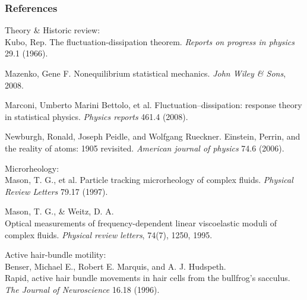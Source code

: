 \documentclass[xcolor=x11names,compress]{beamer}
\renewcommand{\(}{\begin{columns}}
\renewcommand{\)}{\end{columns}}
\newcommand{\<}[1]{\begin{column}{#1}}
\renewcommand{\>}{\end{column}}
\begin{document}
\begin{frame}[t]
    \frametitle<presentation>{References}    

    \scriptsize
    Theory \& Historic review:\\
    \vspace{0.1cm}
    \tiny
    Kubo, Rep. 
    The fluctuation-dissipation theorem.
    \textit{Reports on progress in physics} 29.1 (1966).
    \vspace{0.1cm}

    Mazenko, Gene F.
    Nonequilibrium statistical mechanics. 
    \textit{John Wiley \& Sons}, 2008.
    \vspace{0.1cm}

    Marconi, Umberto Marini Bettolo, et al.
    Fluctuation–dissipation: response theory in statistical physics.
    \textit{Physics reports} 461.4 (2008).
    \vspace{0.1cm}

    Newburgh, Ronald, Joseph Peidle, and Wolfgang Rueckner. 
    Einstein, Perrin, and the reality of atoms: 1905 revisited.
    \textit{American journal of physics} 74.6 (2006).
    \vspace{0.1cm}

    \scriptsize
    Microrheology:\\
    \vspace{0.1cm}
    \tiny
    Mason, T. G., et al.
    Particle tracking microrheology of complex fluids.
    \textit{Physical Review Letters} 79.17 (1997).
    \vspace{0.1cm}

    Mason, T. G., \& Weitz, D. A. \\
    Optical measurements of frequency-dependent 
    linear viscoelastic moduli of complex fluids.  
    \textit{Physical review letters}, 74(7), 1250, 1995. 
    \vspace{0.1cm}

    \scriptsize
    Active hair-bundle motility:\\
    \vspace{0.1cm}
    \tiny
    Benser, Michael E., Robert E. Marquis, and A. J. Hudspeth. \\
    Rapid, active hair bundle movements in hair cells from the bullfrog’s sacculus.
    \textit{The Journal of Neuroscience} 16.18 (1996).
    \vspace{0.1cm}


\end{frame}
\end{document}

